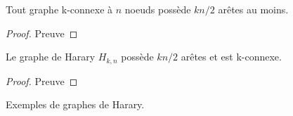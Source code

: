 \begin{mytheo}  
  Tout graphe k-connexe à $n$ noeuds possède $kn/2$ arêtes au moins.
  \begin{proof}
     Preuve
  \end{proof}
\end{mytheo}

\begin{mytheo}  
  Le graphe de Harary $H_{k ,n}$ possède $kn/2$ arêtes et est k-connexe.
  \begin{proof}
     Preuve
  \end{proof}
\end{mytheo}

\begin{myexem}
  Exemples de graphes de Harary.
\end{myexem}